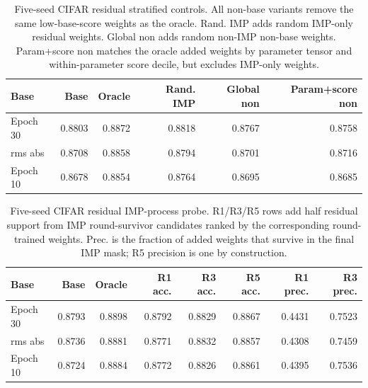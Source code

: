 \begin{table}[t]
\centering
\small
\setlength{\tabcolsep}{3pt}
\begin{tabular}{lrrrrr}
\toprule
Base & Base & Oracle & Rand. IMP & Global non & Param+score non \\
\midrule
Epoch 30 & 0.8803 & 0.8872 & 0.8818 & 0.8767 & 0.8758 \\
rms abs & 0.8708 & 0.8858 & 0.8794 & 0.8701 & 0.8716 \\
Epoch 10 & 0.8678 & 0.8854 & 0.8764 & 0.8695 & 0.8685 \\
\bottomrule
\end{tabular}
\caption{Five-seed CIFAR residual stratified controls. All non-base variants remove the same low-base-score weights as the oracle. Rand. IMP adds random IMP-only residual weights. Global non adds random non-IMP non-base weights. Param+score non matches the oracle added weights by parameter tensor and within-parameter score decile, but excludes IMP-only weights.}
\label{tab:cifar-residual-stratified-controls}
\end{table}

\begin{table}[t]
\centering
\small
\setlength{\tabcolsep}{2.5pt}
\begin{tabular}{lrrrrrrr}
\toprule
Base & Base & Oracle & R1 acc. & R3 acc. & R5 acc. & R1 prec. & R3 prec. \\
\midrule
Epoch 30 & 0.8793 & 0.8898 & 0.8792 & 0.8829 & 0.8867 & 0.4431 & 0.7523 \\
rms abs & 0.8736 & 0.8881 & 0.8771 & 0.8832 & 0.8857 & 0.4308 & 0.7459 \\
Epoch 10 & 0.8724 & 0.8884 & 0.8772 & 0.8826 & 0.8861 & 0.4395 & 0.7536 \\
\bottomrule
\end{tabular}
\caption{Five-seed CIFAR residual IMP-process probe. R1/R3/R5 rows add half residual support from IMP round-survivor candidates ranked by the corresponding round-trained weights. Prec. is the fraction of added weights that survive in the final IMP mask; R5 precision is one by construction.}
\label{tab:cifar-residual-imp-process}
\end{table}

